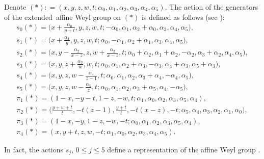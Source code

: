 \documentclass[10pt,a4paper]{amsart}
\numberwithin{equation}{section}
\begin{document}
 Denote $(*): =(x, y, z, w, t ; \alpha_0, \alpha_1, \alpha_2, \alpha_3, \alpha_4, \alpha_5)$.
 The action of the generators of the exten\-ded~affine Weyl group  on $(*)$ is defined as follows (see \cite{Sa}):
 \begin{gather}
 s_0(*) =
 \biggl(x + \frac{\alpha_0}{y+t}, y, z, w, t ; -\alpha_0, \alpha_1, \alpha_2+\alpha_0, \alpha_3, \alpha_4, \alpha_5\biggr),\nonumber\\
 s_1(*) =
 \biggl(x + \frac{\alpha_1}{y}, y, z, w, t ; \alpha_0, -\alpha_1, \alpha_2+\alpha_1, \alpha_3, \alpha_4, \alpha_5\biggr),\nonumber\\
 s_2(*) =
 \biggl(x, y - \frac{\alpha_2}{x-z}, z, w + \frac{\alpha_2}{x-z}, t ; \alpha_0+\alpha_2, \alpha_1+\alpha_2, -\alpha_2,
 \alpha_3+\alpha_2, \alpha_4, \alpha_5\biggr),\nonumber\\
 s_3(*) =
 \biggl(x, y, z + \frac{\alpha_3}{w}, w, t ; \alpha_0, \alpha_1, \alpha_2+\alpha_3, -\alpha_3, \alpha_4+\alpha_3, \alpha_5+\alpha_3\biggr),
 \nonumber
 \\
 s_4 (*) =
 \biggl(x, y, z, w - \frac{\alpha_4}{z-1}, t ; \alpha_0, \alpha_1, \alpha_2, \alpha_3+\alpha_4, -\alpha_4, \alpha_5\biggr),
 \nonumber\\
 s_5 (*) =
 \biggl(x, y, z, w -\frac{\alpha_5}{z}, t ; \alpha_0, \alpha_1, \alpha_2, \alpha_3+\alpha_5, \alpha_4, -\alpha_5\biggr),\nonumber\\
 \pi_1(*) =
 (1-x, -y-t, 1-z, -w, t ; \alpha_1, \alpha_0, \alpha_2, \alpha_3, \alpha_5, \alpha_4),\nonumber\\
 \pi_2(*) =
 \biggl(\frac{y+w+t}{t}, -t (z-1), \frac{y+t}{t}, -t (x-z), -t ; \alpha_5, \alpha_4, \alpha_3, \alpha_2, \alpha_1, \alpha_0\biggr),
 \nonumber\\
 \pi_3(*) =
 (1-x, -y, 1-z, -w, -t ; \alpha_0, \alpha_1, \alpha_2, \alpha_3, \alpha_5, \alpha_4),\nonumber\\
 \pi_4(*) =
 (x, y+t, z, w, -t ; \alpha_1, \alpha_0, \alpha_2, \alpha_3, \alpha_4, \alpha_5) .\label{g}
 \end{gather}

 In fact, the actions $s_j$, $0 \leq j \leq 5$ define a representation of the affine Weyl group .
\end{document}
